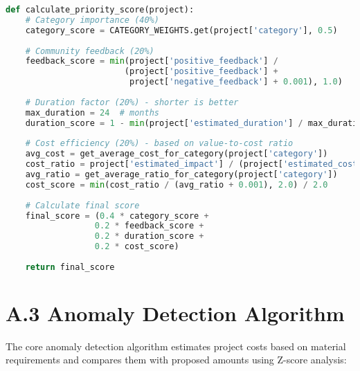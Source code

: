 \documentclass[12pt,a4paper]{report}
\begin{document}
\begin{lstlisting}[language=Python]
def calculate_priority_score(project):
    # Category importance (40%)
    category_score = CATEGORY_WEIGHTS.get(project['category'], 0.5)
    
    # Community feedback (20%)
    feedback_score = min(project['positive_feedback'] / 
                        (project['positive_feedback'] + 
                         project['negative_feedback'] + 0.001), 1.0)
    
    # Duration factor (20%) - shorter is better
    max_duration = 24  # months
    duration_score = 1 - min(project['estimated_duration'] / max_duration, 1.0)
    
    # Cost efficiency (20%) - based on value-to-cost ratio
    avg_cost = get_average_cost_for_category(project['category'])
    cost_ratio = project['estimated_impact'] / (project['estimated_cost'] + 0.001)
    avg_ratio = get_average_ratio_for_category(project['category'])
    cost_score = min(cost_ratio / (avg_ratio + 0.001), 2.0) / 2.0
    
    # Calculate final score
    final_score = (0.4 * category_score + 
                  0.2 * feedback_score + 
                  0.2 * duration_score + 
                  0.2 * cost_score)
    
    return final_score
\end{lstlisting}

\section*{A.3 Anomaly Detection Algorithm}
\indent \indent The core anomaly detection algorithm estimates project costs based on material requirements and compares them with proposed amounts using Z-score analysis:
\end{document}

